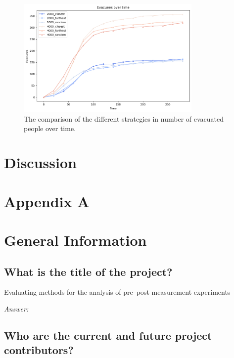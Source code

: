 \documentclass[12pt]{article}
\begin{document}
\begin{figure}
    \centering
    \includegraphics[width=0.8\textwidth]{../images/evacuees_over_time.png}
    \caption{The comparison of the different strategies in number of evacuated people over time.}
    \label{fig:evacuees_over_time}
\end{figure}

\section{Discussion}


\section*{Appendix A}


\section{General Information}
\subsection{What is the title of the project?}

\begin{examplebox}
Evaluating methods for the analysis of pre--post measurement experiments
\end{examplebox}

\textit{Answer:}

\subsection{Who are the current and future project contributors?}
\end{document}
